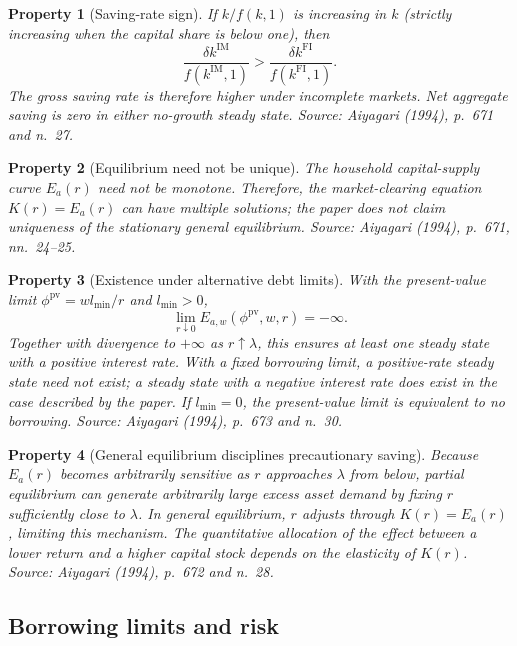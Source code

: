 \documentclass[11pt]{article}
\theoremstyle{propertystyle}
\newtheorem{property}{Property}
\newcommand{\1}{\mathbf{1}}
\begin{document}
\begin{property}[Saving-rate sign]
If $k/f(k,1)$ is increasing in $k$ (strictly increasing when the capital share
is below one), then
\[
  \frac{\delta k^{\mathrm{IM}}}{f(k^{\mathrm{IM}},1)}
  >
  \frac{\delta k^{\mathrm{FI}}}{f(k^{\mathrm{FI}},1)}.
\]
The gross saving rate is therefore higher under incomplete markets.  Net
aggregate saving is zero in either no-growth steady state.
\emph{Source: Aiyagari (1994), p.~671 and n.~27.}
\end{property}

\begin{property}[Equilibrium need not be unique]
The household capital-supply curve $E_a(r)$ need not be monotone.  Therefore,
the market-clearing equation $K(r)=E_a(r)$ can have multiple solutions; the
paper does not claim uniqueness of the stationary general equilibrium.
\emph{Source: Aiyagari (1994), p.~671, nn.~24--25.}
\end{property}

\begin{property}[Existence under alternative debt limits]
With the present-value limit $\phi^{\mathrm{pv}}=wl_{\min}/r$ and
$l_{\min}>0$,
\[
  \lim_{r\downarrow0}E_{a,w}(\phi^{\mathrm{pv}},w,r)=-\infty.
\]
Together with divergence to $+\infty$ as $r\uparrow\lambda$, this ensures at
least one steady state with a positive interest rate.  With a fixed borrowing
limit, a positive-rate steady state need not exist; a steady state with a
negative interest rate does exist in the case described by the paper.
If $l_{\min}=0$, the present-value limit is equivalent to no borrowing.
\emph{Source: Aiyagari (1994), p.~673 and n.~30.}
\end{property}

\begin{property}[General equilibrium disciplines precautionary saving]
Because $E_a(r)$ becomes arbitrarily sensitive as $r$ approaches $\lambda$
from below, partial equilibrium can generate arbitrarily large excess asset
demand by fixing $r$ sufficiently close to $\lambda$.  In general equilibrium,
$r$ adjusts through $K(r)=E_a(r)$, limiting this mechanism.  The quantitative
allocation of the effect between a lower return and a higher capital stock
depends on the elasticity of $K(r)$.  \emph{Source: Aiyagari (1994), p.~672
and n.~28.}
\end{property}

\subsection{Borrowing limits and risk}
\end{document}
